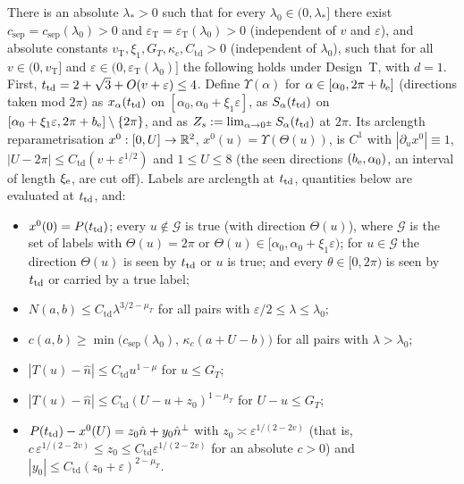 \begin{theorem}\label{thm:touchdown}
There is an absolute $\lambda_*>0$ such that for every $\lambda_0\in(0,\lambda_*]$ there exist
$c_{\mathrm{sep}}=c_{\mathrm{sep}}(\lambda_0)>0$ and $\varepsilon_{\mathrm T}=\varepsilon_{\mathrm T}(\lambda_0)>0$
\textup(independent of $v$ and $\varepsilon$\textup), and absolute constants $v_{\mathrm T},\xi_1,G_T,\kappa_c,
C_{\mathrm{td}}>0$ \textup(independent of $\lambda_0$\textup), such that for all $v\in(0,v_{\mathrm T}]$ and
$\varepsilon\in(0,\varepsilon_{\mathrm T}(\lambda_0)]$ the following holds under Design~T, with $d=1$. First,
$t_{\mathrm{td}}=2+\sqrt3+O(v+\varepsilon)\le4$. Define $\Upsilon(\alpha)$ for
$\alpha\in[\alpha_0,2\pi+b_{\mathrm{e}}]$ \textup(directions taken mod $2\pi$\textup) as $x_\alpha(t_{\mathrm{td}})$ on
$[\alpha_0,\alpha_0+\xi_1\varepsilon]$, as $S_\alpha(t_{\mathrm{td}})$ on $[\alpha_0+\xi_1\varepsilon,2\pi+b_{\mathrm{e}}]\setminus\{2\pi\}$,
and as $Z_s:=\lim_{\alpha\to0^\pm}S_\alpha(t_{\mathrm{td}})$ at $2\pi$. Its arclength reparametrisation $x^0:[0,U]\to\mathbb{R}^2$,
$x^0(u)=\Upsilon(\Theta(u))$, is $C^1$ with $|\partial_ux^0|\equiv1$, $|U-2\pi|\le C_{\mathrm{td}}(v+\varepsilon^{1/2})$ and $1\le U\le8$
\textup(the seen directions $(b_{\mathrm{e}},\alpha_0)$, an interval of length $\xi_{\mathrm{e}}$, are cut off\textup). Labels are arclength at
$t_{\mathrm{td}}$, quantities below are evaluated at $t_{\mathrm{td}}$, and:
\begin{itemize}
\setlength{\itemsep}{1pt}\setlength{\parskip}{0pt}
\item[\textup{(T0)}] $x^0(0)=P(t_{\mathrm{td}})$; every $u\notin\mathcal G$ is true \textup(with direction $\Theta(u)$\textup), where
$\mathcal G$ is the set of labels with $\Theta(u)=2\pi$ or $\Theta(u)\in[\alpha_0,\alpha_0+\xi_1\varepsilon)$; for
$u\in\mathcal G$ the direction $\Theta(u)$ is seen by $t_{\mathrm{td}}$ or $u$ is true; and every $\theta\in[0,2\pi)$ is seen by
$t_{\mathrm{td}}$ or carried by a true label;
\item[\textup{(T1)}] $N(a,b)\le C_{\mathrm{td}}\lambda^{3/2-\mu_T}$ for all pairs with $\varepsilon/2\le\lambda\le\lambda_0$;
\item[\textup{(T2)}] $c(a,b)\ge\min\bigl(c_{\mathrm{sep}}(\lambda_0),\,\kappa_c(a+U-b)\bigr)$ for all pairs with $\lambda>\lambda_0$;
\item[\textup{(T3)}] $|T(u)-\hat n|\le C_{\mathrm{td}}u^{1-\mu}$ for $u\le G_T$;
\item[\textup{(T4)}] $|T(u)-\hat n|\le C_{\mathrm{td}}(U-u+z_0)^{1-\mu_T}$ for $U-u\le G_T$;
\item[\textup{(T5)}] $P(t_{\mathrm{td}})-x^0(U)=z_0\hat n+y_0\hat n^\perp$ with $z_0\asymp\varepsilon^{1/(2-2v)}$
\textup(that is, $c\,\varepsilon^{1/(2-2v)}\le z_0\le C_{\mathrm{td}}\varepsilon^{1/(2-2v)}$ for an absolute $c>0$\textup)
and $|y_0|\le C_{\mathrm{td}}(z_0+\varepsilon)^{2-\mu_T}$.
\end{itemize}
\end{theorem}

